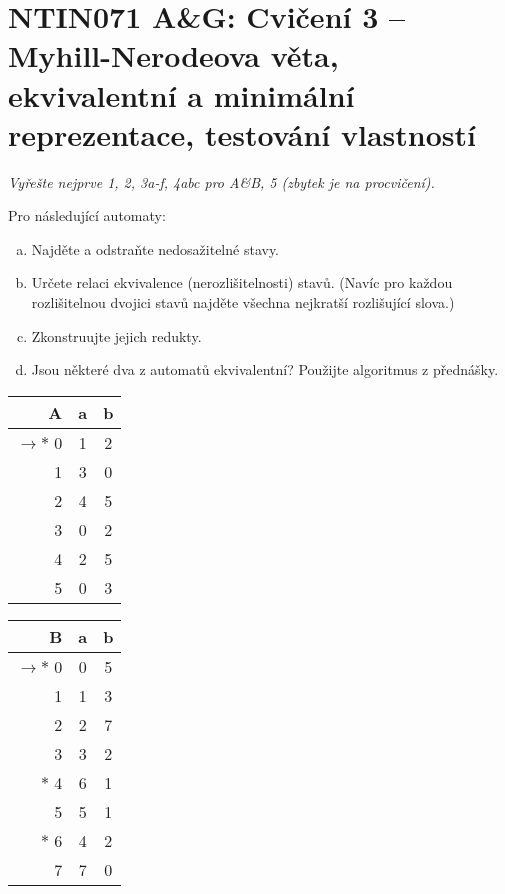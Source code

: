 \documentclass[a4paper,12pt]{amsart}
\begin{document}

\section*{NTIN071 A\&G: Cvičení 3 -- Myhill-Nerodeova věta, ekvivalentní a minimální reprezentace, testování vlastností}


\medskip

\noindent\emph{Vyřešte nejprve 1, 2, 3a-f, 4abc pro A\&B, 5 (zbytek je na procvičení).}

\medskip




\vspace{-12pt}

\medskip\begin{problem}    
    
    Pro následující automaty:

    \begin{enumerate}[(a)]\setlength\itemsep{6pt}
        \item Najděte a odstraňte nedosažitelné stavy.
        \item Určete relaci ekvivalence (nerozlišitelnosti) stavů. (Navíc pro každou rozlišitelnou dvojici stavů najděte všechna nejkratší rozlišující slova.)
        \item Zkonstruujte jejich redukty.
        \item Jsou některé dva z automatů ekvivalentní? Použijte algoritmus z přednášky.
    \end{enumerate}
    
    \begin{multicols}{3}\small\centering
    
        \begin{tabular}{ r | c c }
            A & a & b \\ \hline
            $\to\ast$ 0 & 1 & 2 \\  
            1 & 3 & 0 \\
            2 & 4 & 5 \\
            3 & 0 & 2 \\
            4 & 2 & 5 \\
            5 & 0 & 3
        \end{tabular}
            
        \begin{tabular}{ r | c c }
            B & a & b \\ \hline
            $\to\ast$ 0 & 0 & 5 \\  
            1 & 1 & 3 \\
            2 & 2 & 7 \\
            3 & 3 & 2 \\
            $\ast$ 4 & 6 & 1 \\
            5 & 5 & 1 \\
            $\ast$ 6 & 4 & 2 \\
            7 & 7 & 0
        \end{tabular}
                

\end{multicols}
\end{problem}
\end{document}
